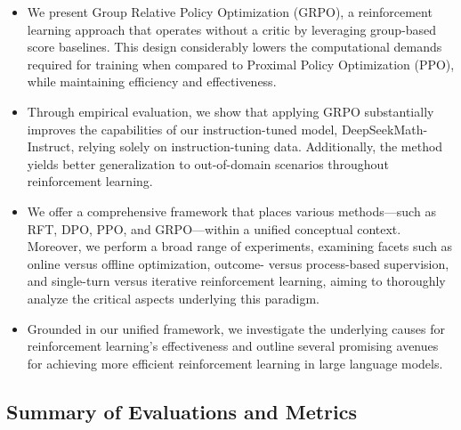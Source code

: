 \begin{itemize}[topsep=0pt]
    \item We present Group Relative Policy Optimization (GRPO), a reinforcement learning approach that operates without a critic by leveraging group-based score baselines. This design considerably lowers the computational demands required for training when compared to Proximal Policy Optimization (PPO), while maintaining efficiency and effectiveness.
    \item Through empirical evaluation, we show that applying GRPO substantially improves the capabilities of our instruction-tuned model, DeepSeekMath-Instruct, relying solely on instruction-tuning data. Additionally, the method yields better generalization to out-of-domain scenarios throughout reinforcement learning.
    \item We offer a comprehensive framework that places various methods—such as RFT, DPO, PPO, and GRPO—within a unified conceptual context. Moreover, we perform a broad range of experiments, examining facets such as online versus offline optimization, outcome- versus process-based supervision, and single-turn versus iterative reinforcement learning, aiming to thoroughly analyze the critical aspects underlying this paradigm.
    \item Grounded in our unified framework, we investigate the underlying causes for reinforcement learning’s effectiveness and outline several promising avenues for achieving more efficient reinforcement learning in large language models.
\end{itemize}

\subsection{Summary of Evaluations and Metrics}

